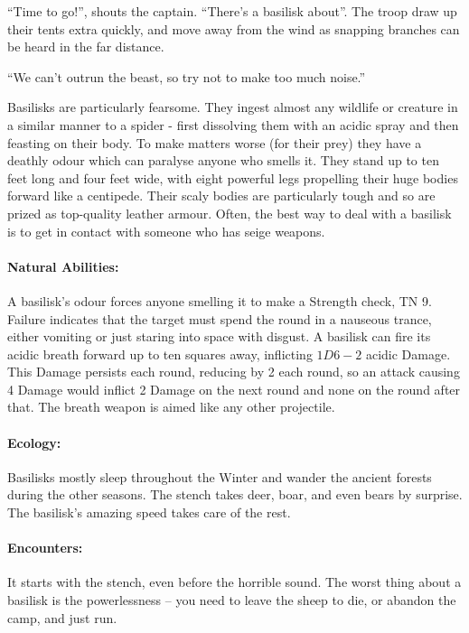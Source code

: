 \begin{multicols}{2}
\begin{boxtext}
	``Time to go!'', shouts the captain.
	``There's a basilisk about''.
	The troop draw up their tents extra quickly, and move away from the wind as snapping branches can be heard in the far distance.

	``We can't outrun the beast, so try not to make too much noise.''

\end{boxtext}

Basilisks are particularly fearsome.
They ingest almost any wildlife or creature in a similar manner to a spider - first dissolving them with an acidic spray and then feasting on their body.
To make matters worse (for their prey) they have a deathly odour which can paralyse anyone who smells it.
They stand up to ten feet long and four feet wide, with eight powerful legs propelling their huge bodies forward like a centipede.
Their scaly bodies are particularly tough and so are prized as top-quality leather armour.
	Often, the best way to deal with a basilisk is to get in contact with someone who has seige weapons.


	\paragraph{Natural Abilities:} A basilisk's odour forces anyone smelling it to make a Strength check, TN 9.  Failure indicates that the target must spend the round in a nauseous trance, either vomiting or just staring into space with disgust.  A basilisk can fire its acidic breath forward up to ten squares away, inflicting $1D6-2$ acidic Damage.  This Damage persists each round, reducing by 2  each round, so an attack causing 4 Damage would inflict 2  Damage on the next round and none on the round after that.  The breath weapon is aimed like any other projectile.

	\paragraph{Ecology:} Basilisks mostly sleep throughout the Winter and wander the ancient forests during the other seasons.  The stench takes deer, boar, and even bears by surprise.  The basilisk's amazing speed takes care of the rest.

	\paragraph{Encounters:} It starts with the stench, even before the horrible sound.  The worst thing about a basilisk is the powerlessness -- you need to leave the sheep to die, or abandon the camp, and just run.


\end{multicols}
